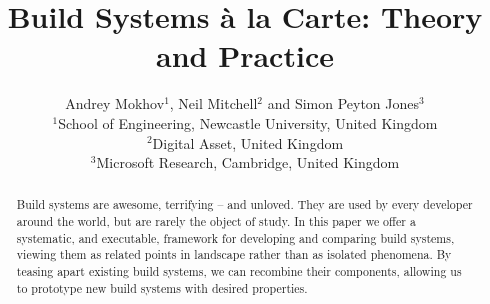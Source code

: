 \documentclass{jfp1}
\newcommand{\cmd}[1]{\textsf{\color[rgb]{0,0,0.5} #1}}
\begin{document}
\title[Build Systems \`a la Carte: Theory and Practice]
{Build Systems \`a la Carte: Theory and Practice}

\author[Andrey Mokhov, Neil Mitchell and Simon Peyton Jones]
{Andrey Mokhov$^1$, Neil Mitchell$^2$ and Simon Peyton Jones$^3$\\
$^1$School of Engineering, Newcastle University, United Kingdom\\
$^2$Digital Asset, United Kingdom\\
$^3$Microsoft Research, Cambridge, United Kingdom}




\maketitle

\begin{abstract}
Build systems are awesome, terrifying -- and unloved. They are used by every
developer around the world, but are rarely the object of study. In this paper we
offer a systematic, and executable, framework for developing and comparing build
systems, viewing them as related points in landscape rather than as isolated
phenomena. By teasing apart existing build systems, we can recombine their
components, allowing us to prototype new build systems with desired properties.
\end{abstract}














% 
\end{document}
